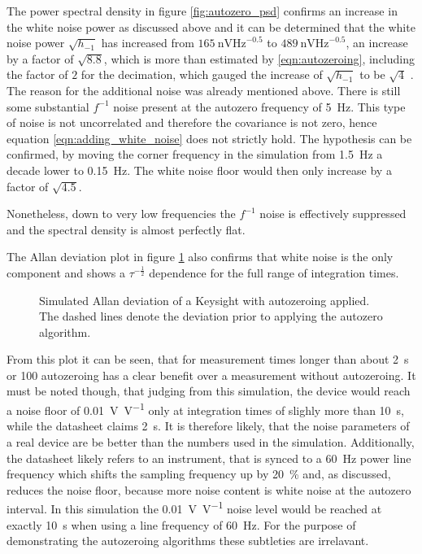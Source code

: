 The power spectral density in figure \ref{fig:autozero_psd} confirms an increase in the white noise power as discussed above and it can be determined that the white noise power $\sqrt{h_{-1}}$ has increased from $\qty[power-half-as-sqrt, per-mode=symbol]{165}{\nV \Hz\tothe{-0.5}}$ to $\qty[power-half-as-sqrt, per-mode=symbol]{489}{\nV \Hz\tothe{-0.5}}$, an increase by a factor of $\sqrt{8.8}$, which is more than estimated by \ref{eqn:autozeroing}, including the factor of $2$ for the decimation, which gauged the increase of $\sqrt{h_{-1}}$ to be $\sqrt{4}$ . The reason for the additional noise was already mentioned above. There is still some substantial $f^{-1}$ noise present at the autozero frequency of \qty{5}{\Hz}. This type of noise is not uncorrelated and therefore the covariance is not zero, hence equation \ref{eqn:adding_white_noise} does not strictly hold. The hypothesis can be confirmed, by moving the corner frequency in the simulation from \qty{1.5}{\Hz} a decade lower to \qty{0.15}{\Hz}. The white noise floor would then only increase by a factor of $\sqrt{4.5}$.

Nonetheless, down to very low frequencies the $f^{-1}$ noise is effectively suppressed and the spectral density is almost perfectly flat.

The Allan deviation plot in figure \ref{fig:autozero_adev} also confirms that white noise is the only component and shows a $\tau^{-\frac 1 2}$ dependence for the full range of integration times.

\begin{figure}[hb]
    \centering
    
    \caption{Simulated Allan deviation of a Keysight  with autozeroing applied. The dashed lines denote the deviation prior to applying the autozero algorithm.}
    \label{fig:autozero_adev}
\end{figure}

From this plot it can be seen, that for measurement times longer than about \qty{2}{\s} or \qty{100}{\plc} autozeroing has a clear benefit over a measurement without autozeroing. It must be noted though, that judging from this simulation, the device would reach a noise floor of \qty[per-mode = symbol]{0.01}{\V \per \V} only at integration times of slighly more than \qty{10}{\s}, while the datasheet claims \qty{2}{\s}. It is therefore likely, that the noise parameters of a real device are be better than the numbers used in the simulation. Additionally, the datasheet likely refers to an instrument, that is synced to a \qty{60}{\Hz} power line frequency which shifts the sampling frequency up by \qty{20}{\percent} and, as discussed, reduces the noise floor, because more noise content is white noise at the autozero interval. In this simulation the \qty{0.01}{\V \per \V} noise level would be reached at exactly \qty{10}{\s} when using a line frequency of \qty{60}{\Hz}. For the purpose of demonstrating the autozeroing algorithms these subtleties are irrelavant.

